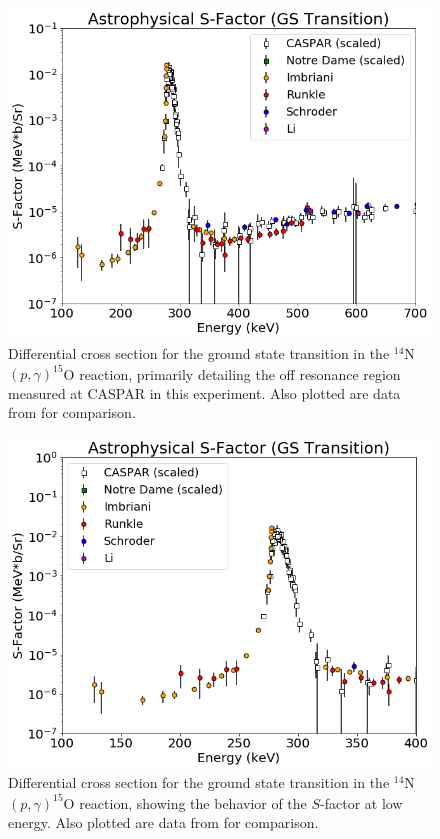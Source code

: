 \begin{figure}
		\includegraphics[width=1.0\linewidth]{figures/midGS.png}
	\caption{Differential cross section for the ground state transition in the $^{14}$N$\left( p,\gamma \right) ^{15}$O reaction, primarily detailing the off resonance region measured at CASPAR in this experiment. Also plotted are data from \cite{Schroder1987, Imbriani2005, Runkle2005, Li2016} for comparison.  }
	\label{fig: midGS}
\end{figure}



\begin{figure}
		\includegraphics[width=1.0\linewidth]{figures/lowGS.png}
	\caption{Differential cross section for the ground state transition in the $^{14}$N$\left( p,\gamma \right) ^{15}$O reaction, showing the behavior of the $S$-factor at low energy. Also plotted are data from \cite{Schroder1987, Imbriani2005, Runkle2005, Li2016} for comparison. }
	\label{fig: lowGS}
\end{figure}

